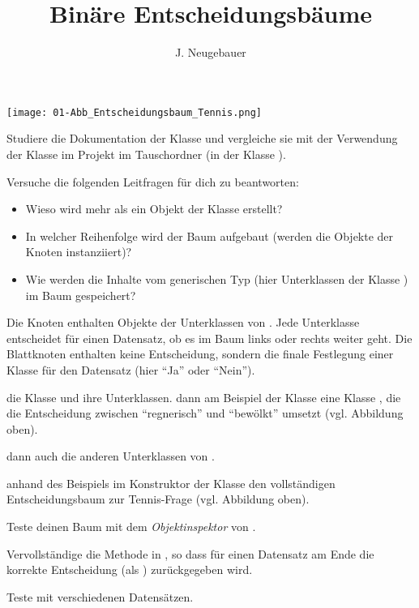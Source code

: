 \documentclass[10pt, a4paper]{scrartcl}
\author{J. Neugebauer}
\title{Binäre Entscheidungsbäume}
\date{\Heute}
\begin{document}
\ReiheTitel

\begin{center}
	\texttt{[image: 01-Abb\_Entscheidungsbaum\_Tennis.png]}
\end{center}

\begin{aufgabe}
	Studiere die Dokumentation der Klasse  und vergleiche sie mit der Verwendung der Klasse im Projekt  im Tauschordner (in der Klasse ).
	
	Versuche die folgenden Leitfragen für dich zu beantworten:
	\begin{itemize}
		\item Wieso wird mehr als ein Objekt der Klasse  erstellt?
		\item In welcher Reihenfolge wird der Baum aufgebaut (werden die Objekte der Knoten instanziiert)?
		\item Wie werden die Inhalte vom generischen Typ  (hier Unterklassen der Klasse ) im Baum gespeichert?
	\end{itemize}
\end{aufgabe}

\begin{aufgabe}
	Die Knoten enthalten Objekte der Unterklassen von . Jede Unterklasse entscheidet für einen Datensatz, ob es im Baum links oder rechts weiter geht. Die Blattknoten enthalten keine Entscheidung, sondern die finale Festlegung einer Klasse für den Datensatz (hier \enquote{Ja} oder \enquote{Nein}).
	
	 die Klasse  und ihre Unterklassen.  dann am Beispiel der Klasse  eine Klasse , die die Entscheidung
	zwischen \enquote{regnerisch} und \enquote{bewölkt} umsetzt (vgl. Abbildung oben).
	
	 dann auch die anderen Unterklassen von .
\end{aufgabe}

\begin{aufgabe}
	 anhand des Beispiels im Konstruktor der Klasse  den vollständigen Entscheidungsbaum zur Tennis-Frage (vgl. Abbildung oben).
	
	Teste deinen Baum mit dem \emph{Objektinspektor} von .
\end{aufgabe}

\begin{aufgabe}
	Vervollständige die Methode  in , so dass für einen Datensatz am Ende die korrekte Entscheidung (als ) zurückgegeben wird.
	
	Teste mit verschiedenen Datensätzen.
\end{aufgabe}
\end{document}
